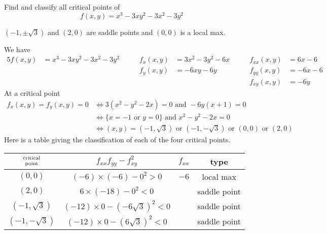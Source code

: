 \begin{question}[M200 2000D] %
 Find and classify all critical points of
$$
f(x,y)=x^3-3xy^2-3x^2-3y^2
$$
\end{question}

%

\begin{answer}
$(-1,\pm\sqrt{3})$ and $(2,0)$ are saddle points and 
$(0,0)$ is  a local max.
\end{answer}

\begin{solution}
We have
\begin{alignat*}{5}
f(x,y)&=x^3-3xy^2-3x^2-3y^2\qquad &
f_x(x,y)&=3x^2-3y^2-6x\qquad &
f_{xx}(x,y)&=6x-6 \\
 & & f_y(x,y)&=-6xy-6y &
f_{yy}(x,y)&=-6x-6 \\
 & & & &f_{xy}(x,y)&=-6y
\end{alignat*}
At a critical point
\begin{align*}
f_x(x,y)=f_y(x,y)=0
&\iff 3(x^2-y^2-2x)=0\text{ and }-6y(x+1)=0 \\
&\iff \{x=-1\text{ or }y=0\}\text{ and }x^2-y^2-2x=0 \\
&\iff (x,y)=(-1,\sqrt{3})\text{ or }(-1,-\sqrt{3})\text{ or }(0,0)
\text{ or }(2,0)
\end{align*}
Here is a table giving the classification of each of the four critical
points.
\begin{center}
\renewcommand{\arraystretch}{1.3}
     \begin{tabular}{|c|c|c|c|}
     \hline
    $\Atop{\text{critical}}{\text{point}}$  & $f_{xx}f_{yy}-f_{xy}^2$ & 
                                                          $f_{xx}$ & type \\    
    \hline
     $(0,0)$   & $(-6)\times(-6)-0^2>0$ & $-6$ & local max \\ \hline
     $(2,0)$   & $6\times(-18)-0^2<0$   &      & saddle point \\  \hline
  $(-1,\sqrt{3})$ & $(-12)\times0-(-6\sqrt{3})^2<0$ & & saddle point \\ \hline
  $(-1,-\sqrt{3})$ &$(-12)\times 0-(6\sqrt{3})^2<0$ & & saddle point \\ \hline
     \end{tabular}
\renewcommand{\arraystretch}{1.0}
\end{center}
\end{solution}

